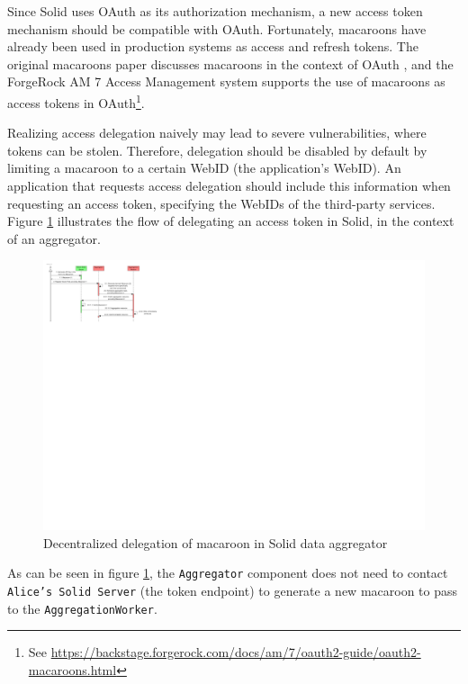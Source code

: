 Since Solid uses OAuth as its authorization mechanism, a new access token mechanism should be compatible with OAuth. Fortunately, macaroons have already been used in production systems as access and refresh tokens. The original macaroons paper discusses macaroons in the context of OAuth \citep[p.12]{macaroons}, and the ForgeRock AM 7 Access Management system supports the use of macaroons as access tokens in OAuth\footnote{See \url{https://backstage.forgerock.com/docs/am/7/oauth2-guide/oauth2-macaroons.html}}.

Realizing access delegation naively may lead to severe vulnerabilities, where tokens can be stolen. Therefore, delegation should be disabled by default by limiting a macaroon to a certain WebID (the application's WebID). An application that requests access delegation should include this information when requesting an access token, specifying the WebIDs of the third-party services. Figure \ref{fig:decentralized-delegation-macaroon} illustrates the flow of delegating an access token in Solid, in the context of an aggregator.

\begin{figure}[h]
    \centering
   \includegraphics[width=1.0\textwidth]{images/macaroons-solid/InteractionDiagram-Decentralized-Delegation-of-Macaroon.pdf}
    \caption{Decentralized delegation of macaroon in Solid data aggregator}
    \label{fig:decentralized-delegation-macaroon}
\end{figure}

\noindent As can be seen in figure \ref{fig:decentralized-delegation-macaroon}, the \texttt{Aggregator} component does not need to contact \texttt{Alice's Solid Server} (the token endpoint) to generate a new macaroon to pass to the \texttt{AggregationWorker}. 

